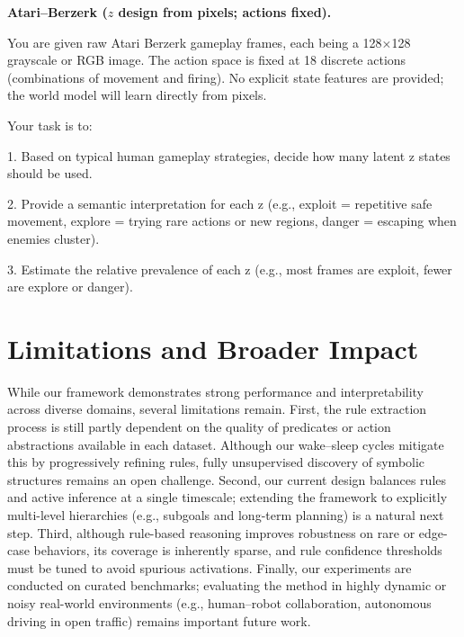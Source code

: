 \documentclass{article} %
\begin{document}
\noindent\textbf{Atari–Berzerk ($z$ design from pixels; actions fixed).}\\[-0.3em]
\begin{PromptBox}
You are given raw Atari Berzerk gameplay frames, each being a 128×128
grayscale or RGB image. The action space is fixed at 18 discrete actions
(combinations of movement and firing). No explicit state features are provided;
the world model will learn directly from pixels.

Your task is to:

1. Based on typical human gameplay strategies, decide how many latent z states
   should be used.

2. Provide a semantic interpretation for each z (e.g., exploit = repetitive safe
   movement, explore = trying rare actions or new regions, danger = escaping when
   enemies cluster).

3. Estimate the relative prevalence of each z (e.g., most frames are exploit,
   fewer are explore or danger).
\end{PromptBox}


\section{Limitations and Broader Impact}
\label{sec:limitations}

While our framework demonstrates strong performance and interpretability across
diverse domains, several limitations remain. First, the rule extraction process
is still partly dependent on the quality of predicates or action abstractions
available in each dataset. Although our wake--sleep cycles mitigate this by
progressively refining rules, fully unsupervised discovery of symbolic structures
remains an open challenge. Second, our current design balances rules and active
inference at a single timescale; extending the framework to explicitly
multi-level hierarchies (e.g., subgoals and long-term planning) is a natural
next step. Third, although rule-based reasoning improves robustness on rare or
edge-case behaviors, its coverage is inherently sparse, and rule confidence
thresholds must be tuned to avoid spurious activations. Finally, our experiments
are conducted on curated benchmarks; evaluating the method in highly dynamic or
noisy real-world environments (e.g., human–robot collaboration, autonomous
driving in open traffic) remains important future work.
\end{document}

